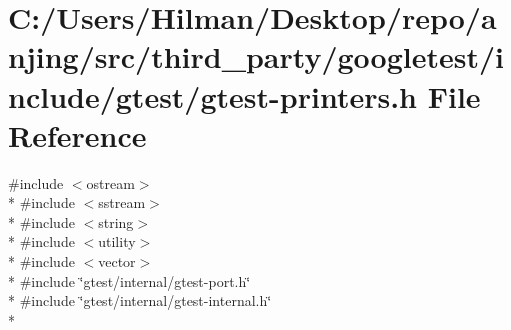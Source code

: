 \hypertarget{gtest-printers_8h}{}\section{C\+:/\+Users/\+Hilman/\+Desktop/repo/anjing/src/third\+\_\+party/googletest/include/gtest/gtest-\/printers.h File Reference}
\label{gtest-printers_8h}
{\ttfamily \#include $<$ostream$>$}\\*
{\ttfamily \#include $<$sstream$>$}\\*
{\ttfamily \#include $<$string$>$}\\*
{\ttfamily \#include $<$utility$>$}\\*
{\ttfamily \#include $<$vector$>$}\\*
{\ttfamily \#include \char`\"{}gtest/internal/gtest-\/port.\+h\char`\"{}}\\*
{\ttfamily \#include \char`\"{}gtest/internal/gtest-\/internal.\+h\char`\"{}}\\*
